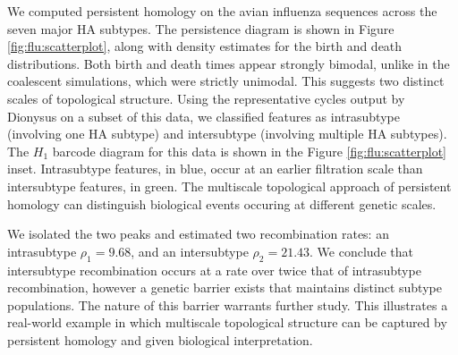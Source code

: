 We computed persistent homology on the avian influenza sequences across the seven major HA subtypes.
The persistence diagram is shown in Figure \ref{fig:flu:scatterplot}, along with density estimates for the birth and death distributions.
Both birth and death times appear strongly bimodal, unlike in the coalescent simulations, which were strictly unimodal.
This suggests two distinct scales of topological structure.
Using the representative cycles output by Dionysus on a subset of this data, we classified features as intrasubtype (involving one HA subtype) and intersubtype (involving multiple HA subtypes).
The $H_1$ barcode diagram for this data is shown in the Figure \ref{fig:flu:scatterplot} inset.
Intrasubtype features, in blue, occur at an earlier filtration scale than intersubtype features, in green.
The multiscale topological approach of persistent homology can distinguish biological events occuring at different genetic scales.

We isolated the two peaks and estimated two recombination rates: an intrasubtype $\rho_{1}=9.68$, and an intersubtype $\rho_{2}=21.43$.
We conclude that intersubtype recombination occurs at a rate over twice that of intrasubtype recombination, however a genetic barrier exists that maintains distinct subtype populations.
The nature of this barrier warrants further study.
This illustrates a real-world example in which multiscale topological structure can be captured by persistent homology and given biological interpretation.

